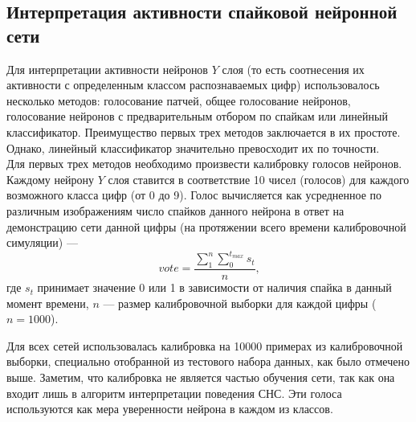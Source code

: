 \documentclass[a4paper]{article}
\begin{document}
\subsection{Интерпретация активности спайковой нейронной сети}

Для интерпретации активности нейронов $Y$ слоя (то есть соотнесения их активности с определенным классом распознаваемых цифр) использовалось несколько методов: голосование патчей, общее голосование нейронов, голосование нейронов с предварительным отбором по спайкам или линейный классификатор. Преимущество первых трех методов заключается в их простоте. Однако, линейный классификатор значительно превосходит их по точности.\\

Для первых трех методов необходимо произвести калибровку голосов нейронов. Каждому нейрону $Y$ слоя ставится в соответствие 10 чисел (голосов) для каждого возможного класса цифр (от 0 до 9). Голос вычисляется как усредненное по различным изображениям число спайков данного нейрона в ответ на демонстрацию сети данной цифры (на протяжении всего времени калибровочной симуляции) ---
$$vote = \frac{\sum_{1}^{n} {\sum_{0}^{t_{max}} s_t}}{n} \text{,}$$
где $s_t$ принимает значение 0 или 1 в зависимости от наличия спайка в данный момент времени, $n$ --- размер калибровочной выборки для каждой цифры ($n = 1000$).

Для всех сетей использовалась калибровка на 10000 примерах из калибровочной выборки, специально отобранной из тестового набора данных, как было отмечено выше. Заметим, что калибровка не является частью обучения сети, так как она входит лишь в алгоритм интерпретации поведения СНС. Эти голоса используются как мера уверенности нейрона в каждом из классов.
\end{document}
